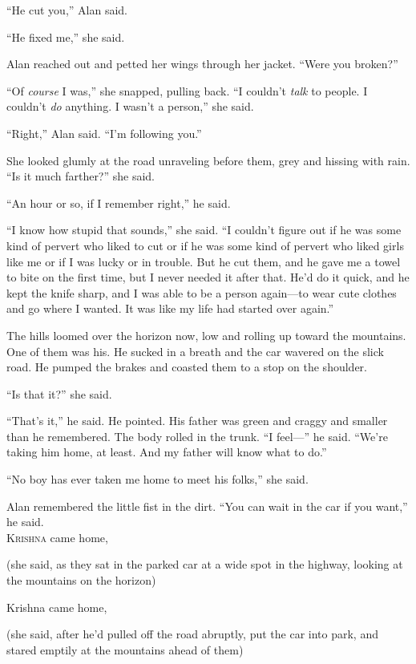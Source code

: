 \documentclass{article}
\begin{document}
``He cut you,'' Alan said.

``He fixed me,'' she said.

Alan reached out and petted her wings through her jacket.  ``Were you
broken?''

``Of \textit{course} I was,'' she snapped, pulling back.  ``I couldn't
\textit{talk} to people.  I couldn't \textit{do} anything.  I wasn't a
person,'' she said.

``Right,'' Alan said.  ``I'm following you.''

She looked glumly at the road unraveling before them, grey and hissing
with rain.  ``Is it much farther?'' she said.

``An hour or so, if I remember right,'' he said.

``I know how stupid that sounds,'' she said.  ``I couldn't figure out
if he was some kind of pervert who liked to cut or if he was some kind
of pervert who liked girls like me or if I was lucky or in trouble. 
But he cut them, and he gave me a towel to bite on the first time, but
I never needed it after that.  He'd do it quick, and he kept the knife
sharp, and I was able to be a person again---to wear cute clothes and
go where I wanted.  It was like my life had started over again.''

The hills loomed over the horizon now, low and rolling up toward the
mountains.  One of them was his.  He sucked in a breath and the car
wavered on the slick road.  He pumped the brakes and coasted them to a
stop on the shoulder.

``Is that it?'' she said.

``That's it,'' he said.  He pointed.  His father was green and craggy
and smaller than he remembered.  The body rolled in the trunk.  ``I
feel---'' he said.  ``We're taking him home, at least.  And my father
will know what to do.''

``No boy has ever taken me home to meet his folks,'' she said.

Alan remembered the little fist in the dirt.  ``You can wait in the
car if you want,'' he said.
\\
\lettrine[lines=3, lhang=.5, nindent=0pt, findent=2pt]{K}{rishna} came home,

(she said, as they sat in the parked car at a wide spot in the
highway, looking at the mountains on the horizon)

Krishna came home,

(she said, after he'd pulled off the road abruptly, put the car into
park, and stared emptily at the mountains ahead of them)
\end{document}
